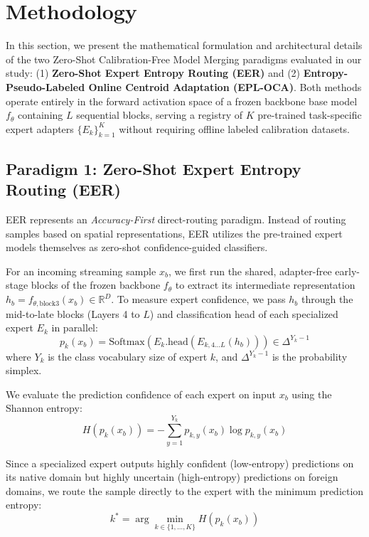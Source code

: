 \section{Methodology}
\label{sec:method}

In this section, we present the mathematical formulation and architectural details of the two Zero-Shot Calibration-Free Model Merging paradigms evaluated in our study: (1) \textbf{Zero-Shot Expert Entropy Routing (EER)} and (2) \textbf{Entropy-Pseudo-Labeled Online Centroid Adaptation (EPL-OCA)}. Both methods operate entirely in the forward activation space of a frozen backbone base model $f_\theta$ containing $L$ sequential blocks, serving a registry of $K$ pre-trained task-specific expert adapters $\{E_k\}_{k=1}^K$ without requiring offline labeled calibration datasets.

\subsection{Paradigm 1: Zero-Shot Expert Entropy Routing (EER)}
EER represents an \emph{Accuracy-First} direct-routing paradigm. Instead of routing samples based on spatial representations, EER utilizes the pre-trained expert models themselves as zero-shot confidence-guided classifiers.

For an incoming streaming sample $x_b$, we first run the shared, adapter-free early-stage blocks of the frozen backbone $f_\theta$ to extract its intermediate representation $h_b = f_{\theta, \text{block3}}(x_b) \in \mathbb{R}^D$. To measure expert confidence, we pass $h_b$ through the mid-to-late blocks (Layers 4 to $L$) and classification head of each specialized expert $E_k$ in parallel:
\begin{equation}
p_k(x_b) = \text{Softmax}\left( E_k.\text{head}(E_{k, 4 \dots L}(h_b)) \right) \in \Delta^{Y_k - 1}
\label{eq:eer_expert_prob}
\end{equation}
where $Y_k$ is the class vocabulary size of expert $k$, and $\Delta^{Y_k - 1}$ is the probability simplex.

We evaluate the prediction confidence of each expert on input $x_b$ using the Shannon entropy:
\begin{equation}
H(p_k(x_b)) = - \sum_{y=1}^{Y_k} p_{k, y}(x_b) \log p_{k, y}(x_b)
\label{eq:eer_sample_entropy}
\end{equation}

Since a specialized expert outputs highly confident (low-entropy) predictions on its native domain but highly uncertain (high-entropy) predictions on foreign domains, we route the sample directly to the expert with the minimum prediction entropy:
\begin{equation}
k^* = \arg\min_{k \in \{1, \dots, K\}} H(p_k(x_b))
\label{eq:eer_routing}
\end{equation}

